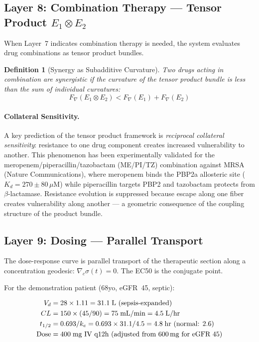 \documentclass[11pt]{article}
\newtheorem{definition}[theorem]{Definition}
\begin{document}
\subsection{Layer 8: Combination Therapy — Tensor Product $E_1 \otimes E_2$}

When Layer~7 indicates combination therapy is needed, the system evaluates drug combinations
as tensor product bundles.

\begin{definition}[Synergy as Subadditive Curvature]
Two drugs acting in combination are synergistic if the curvature of the tensor product bundle
is less than the sum of individual curvatures:
\begin{equation}
F_\nabla(E_1 \otimes E_2) < F_\nabla(E_1) + F_\nabla(E_2)
\end{equation}
\end{definition}

\paragraph{Collateral Sensitivity.}
A key prediction of the tensor product framework is \emph{reciprocal collateral sensitivity}:
resistance to one drug component creates increased vulnerability to another. This phenomenon
has been experimentally validated for the meropenem/piperacillin/tazobactam (ME/PI/TZ)
combination against MRSA (Nature Communications), where meropenem binds the PBP2a allosteric
site ($K_d = 270 \pm 80$\,$\mu$M) while piperacillin targets PBP2 and tazobactam protects
from $\beta$-lactamase. Resistance evolution is suppressed because escape along one fiber
creates vulnerability along another — a geometric consequence of the coupling structure of
the product bundle.

\subsection{Layer 9: Dosing — Parallel Transport}

The dose-response curve is parallel transport of the therapeutic section along a
concentration geodesic: $\nabla_c \sigma(t) = 0$. The EC50 is the conjugate point.

For the demonstration patient (68yo, eGFR~45, septic):

\begin{align}
V_d &= 28 \times 1.11 = 31.1\;\text{L (sepsis-expanded)} \\
CL &= 150 \times (45/90) = 75\;\text{mL/min} = 4.5\;\text{L/hr} \\
t_{1/2} &= 0.693/k_e = 0.693 \times 31.1/4.5 = 4.8\;\text{hr (normal: 2.6)} \\
\text{Dose} &= 400\;\text{mg IV q12h (adjusted from 600\,mg for eGFR 45)}
\end{align}
\end{document}
